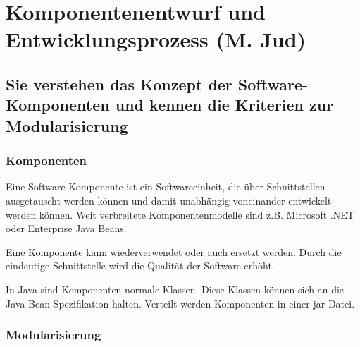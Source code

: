 \section{Komponentenentwurf und Entwicklungsprozess (M. Jud)}
\label{sec:jud}

\subsection{Sie verstehen das Konzept der Software-Komponenten und kennen die Kriterien zur Modularisierung}

\subsubsection{Komponenten}

Eine Software-Komponente ist ein Softwareeinheit, die über Schnittstellen ausgetauscht werden können und damit unabhängig voneinander entwickelt werden können. Weit verbreitete Komponentenmodelle sind z.B. Microsoft .NET oder Enterprise Java Beans.

Eine Komponente kann wiederverwendet oder auch ersetzt werden. Durch die eindeutige Schnittstelle wird die Qualität der Software erhöht. 

In Java sind Komponenten normale Klassen. Diese Klassen können sich an die Java Bean Spezifikation halten. Verteilt werden Komponenten in einer jar-Datei.

\subsubsection{Modularisierung}

